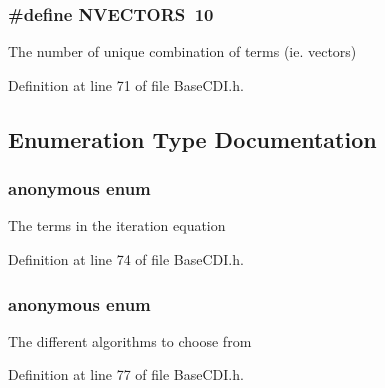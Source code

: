 \subsubsection{\setlength{\rightskip}{0pt plus 5cm}\#define NVECTORS~10}\label{BaseCDI_8h_0ca34ffb02eaf6136977911eb748cb9e}


The number of unique combination of terms (ie. vectors) 

Definition at line 71 of file Base\-CDI.h.

\subsection{Enumeration Type Documentation}
\subsubsection{\setlength{\rightskip}{0pt plus 5cm}anonymous enum}\label{BaseCDI_8h_2e520baeab5e72a8cd84e00dce61684f}


The terms in the iteration equation 

Definition at line 74 of file Base\-CDI.h.\subsubsection{\setlength{\rightskip}{0pt plus 5cm}anonymous enum}\label{BaseCDI_8h_39b3af0f22dc1b8cb10e193d9fc491b4}


The different algorithms to choose from 

Definition at line 77 of file Base\-CDI.h.